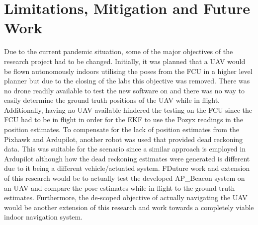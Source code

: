 \section{Limitations, Mitigation and Future Work}\label{sec:limitations,-mitigations-and-future-work}
Due to the current pandemic situation, some of the major objectives of the research project had to be changed.
Initially, it was planned that a UAV would be flown autonomously indoors utilising the poses from the FCU in a higher level planner but due to the closing of the labs this objective was removed.
There was no drone readily available to test the new software on and there was no way to easily determine the ground truth positions of the UAV while in flight.
Additionally, having no UAV available hindered the testing on the FCU since the FCU had to be in flight in order for the EKF to use the Pozyx readings in the position estimates.
To compensate for the lack of position estimates from the Pixhawk and Ardupilot, another robot was used that provided dead reckoning data.
This was suitable for the scenario since a similar approach is employed in Ardupilot although how the dead reckoning estimates were generated is different due to it being a different vehicle/actuated system.
FDuture work and extension of this research would be to actually test the developed AP\_Beacon system on an UAV and compare the pose estimates while in flight to the ground truth estimates.
Furthermore, the de-scoped objective of actually navigating the UAV would be another extension of this research and work towards a completely viable indoor navigation system.
